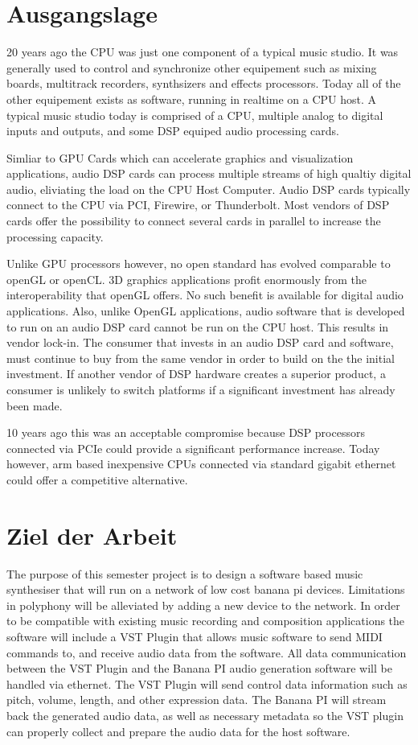 \section{Ausgangslage}

20 years ago the CPU was just one component of a typical music studio. It was generally used to control and synchronize other equipement such as mixing boards, multitrack recorders, synthsizers and effects processors. Today all of the other equipement exists as software, running in realtime on a CPU host. A typical music studio today is comprised of a CPU, multiple analog to digital inputs and outputs, and some DSP equiped audio processing cards.

Simliar to GPU Cards which can accelerate graphics and visualization applications, audio DSP cards can process multiple streams of high qualtiy digital audio, eliviating the load on the CPU Host Computer. Audio DSP cards typically connect to the CPU via PCI, Firewire, or Thunderbolt. Most vendors of DSP cards offer the possibility to connect several cards in parallel to increase the processing capacity.

Unlike GPU processors however, no open standard has evolved comparable to openGL or openCL. 3D graphics applications profit enormously from the interoperability that openGL offers. No such benefit is available for digital audio applications. Also, unlike OpenGL applications, audio software that is developed to run on an audio DSP card cannot be run on the CPU host. This results in vendor lock-in. The consumer that invests in an audio DSP card and software, must continue to buy from the same vendor in order to build on the the initial investment. If another vendor of DSP hardware creates a superior product, a consumer is unlikely to switch platforms if a significant investment has already been made.

10 years ago this was an acceptable compromise because DSP processors connected via PCIe could provide a significant performance increase. Today however, arm based inexpensive CPUs connected via standard gigabit ethernet could offer a competitive alternative.

\section{Ziel der Arbeit}

The purpose of this semester project is to design a software based music synthesiser that will run on a network of low cost banana pi devices. Limitations in polyphony will be alleviated by adding a new device to the network. In order to be compatible with existing music recording and composition applications the software will include a VST Plugin that allows music software to send MIDI commands to, and receive audio data from the software. All data communication between the VST Plugin and the Banana PI audio generation software will be handled via ethernet. The VST Plugin will send control data information such as pitch, volume, length, and other expression data. The Banana PI will stream back the generated audio data, as well as necessary metadata so the VST plugin can properly collect and prepare the audio data for the host software.


